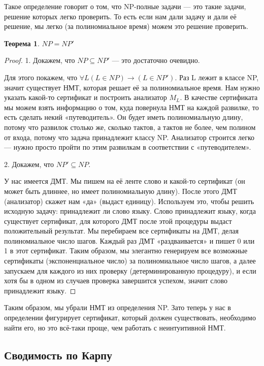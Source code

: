 \documentclass[a4paper]{article}
\newtheorem{theorem} {Теорема}
\begin{document}
{Такое определение говорит о том, что NP-полные задачи — это такие задачи, решение которых легко проверить. То есть если нам дали задачу и дали её решение, мы легко (за полиномиальное время) можем это решение проверить.
\begin{theorem} \textbf{$NP = NP'$} 
\end{theorem}
\begin{proof}

1. Докажем, что $NP \subseteq NP'$ — это достаточно очевидно.

Для этого покажем, что $\forall L (L \in NP) \rightarrow (L \in NP')$. Раз L лежит в классе NP, значит существует НМТ, которая решает её за полиномиальное время. Нам нужно указать какой-то сертификат и построить анализатор $M_L$. В качестве сертификата мы можем взять информацию о том, куда повернула НМТ на каждой развилке, то есть сделать некий «путеводитель». Он будет иметь полиномиальную длину, потому что развилок столько же, сколько тактов, а тактов не более, чем полином от входа, потому что задача принадлежит классу NP. Анализатор строится легко — нужно просто пройти по этим развилкам в соответствии с «путеводителем».

2. Докажем, что $NP' \subseteq NP$.

У нас имеется ДМТ. Мы пишем на её ленте слово и какой-то сертификат (он может быть длиннее, но имеет полиномиальную длину). После этого ДМТ (анализатор) скажет нам «да» (выдаст единицу). Используем это, чтобы решить исходную задачу: принадлежит ли слово языку. Слово принадлежит языку, когда существует сертификат, для которого ДМТ после этой процедуры выдаст положительный результат. Мы перебираем все сертификаты на ДМТ, делая полиномиальное число шагов. Каждый раз ДМТ «раздваивается» и пишет 0 или 1 в этот сертификат. Таким образом, мы элегантно генерируем все возможные сертификаты (экспоненциальное число) за полиномиальное число шагов, а далее запускаем для каждого из них проверку (детерминированную процедуру), и если хотя бы в одном из случаев проверка завершится успехом, значит слово принадлежит языку.
\end{proof}

Таким образом, мы убрали НМТ из определения NP. Зато теперь у нас в определении фигурирует сертификат, который должен существовать, необходимо найти его, но это всё-таки проще, чем работать с неинтуитивной НМТ.

\subsection{Сводимость по Карпу}

}
\end{document}

